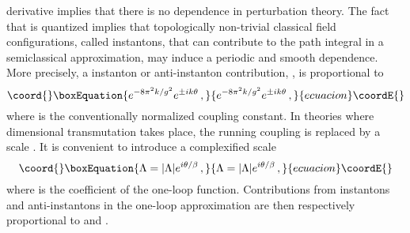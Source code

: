 \documentclass[a4paper,12pt]{article}
\begin{document}
derivative implies that there is no \myHighlight{$\theta$}\coordHE{} dependence in 
perturbation theory. The fact that \coordHE{} is 
quantized implies that topologically non-trivial classical field 
configurations, called instantons, that can contribute to the path 
integral in a semiclassical approximation, may induce a \myHighlight{$2\pi$}\coordHE{} 
periodic and smooth \myHighlight{$\theta$}\coordHE{} dependence. More precisely, a \coordHE{} instanton or 
\coordHE{} anti-instanton contribution, \coordHE{}, is proportional to
%
\begin{equation}\coord{}\boxEquation{
\label{insc}
e^{-8\pi^{2}k/g^{2}}e^{\pm ik\theta}\, ,
}{
e^{-8\pi^{2}k/g^{2}}e^{\pm ik\theta}\, ,
}{ecuacion}\coordE{}\end{equation}
%
where \coordHE{} is the conventionally normalized coupling constant. In 
theories where dimensional transmutation takes place, the running 
coupling \coordHE{} is replaced by a scale \myHighlight{$|\Lambda|$}\coordHE{}. It is convenient to 
introduce a complexified scale
%
\begin{equation}\coord{}\boxEquation{
\label{scale}
\Lambda = |\Lambda|e^{i\theta/\beta}\, ,
}{
\Lambda = |\Lambda|e^{i\theta/\beta}\, ,
}{ecuacion}\coordE{}\end{equation}
%
where \myHighlight{$\beta$}\coordHE{} is the coefficient of the one-loop \myHighlight{$\beta$}\coordHE{} function. 
Contributions from \coordHE{} instantons and \coordHE{} anti-instantons in the one-loop 
approximation are then respectively proportional to 
\coordHE{} and \coordHE{}.
\end{document}
